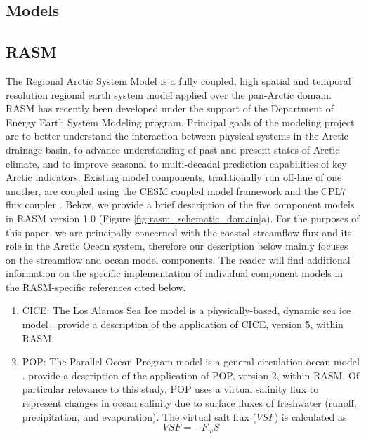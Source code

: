 \documentclass[jgrga, draft]{agutex}
\begin{document}
\begin{article}
\section{Models}
\label{sec:models}

\subsection{RASM}
\label{sec:rasm}
The Regional Arctic System Model is a fully coupled, high spatial and temporal resolution regional earth system model applied over the pan-Arctic domain.
RASM has recently been developed under the support of the Department of Energy Earth System Modeling program.
Principal goals of the modeling project are to better understand the interaction between physical systems in the Arctic drainage basin, to advance understanding of past and present states of Arctic climate, and to improve seasonal to multi-decadal prediction capabilities of key Arctic indicators.
Existing model components, traditionally run off-line of one another, are coupled using the CESM coupled model framework and the CPL7 flux coupler \citep{Craig_2011}.
Below, we provide a brief description of the five component models in RASM version 1.0 (Figure \ref{fig:rasm_schematic_domain}a).
For the purposes of this paper, we are principally concerned with the coastal streamflow flux and its role in the Arctic Ocean system, therefore our description below mainly focuses on the streamflow and ocean model components.
The reader will find additional information on the specific implementation of individual component models in the RASM-specific references cited below.

\begin{enumerate}
\item CICE: The Los Alamos Sea Ice model is a physically-based, dynamic sea ice model \citep{Hunke_2010}.
\citet{Roberts_2015a} provide a description of the application of CICE, version 5, within RASM.
\item POP: The Parallel Ocean Program model is a general circulation ocean model \citep{Smith_2010}.
\citet{Roberts_2015a} provide a description of the application of POP, version 2, within RASM.
Of particular relevance to this study, POP uses a virtual salinity flux to represent changes in ocean salinity due to surface fluxes of freshwater (runoff, precipitation, and evaporation).
The virtual salt flux ($VSF$) is calculated as
\begin{equation}
  \label{eq:SaltFlux}
  VSF= -F_w S
\end{equation}


\end{enumerate}
\end{article}
\end{document}
